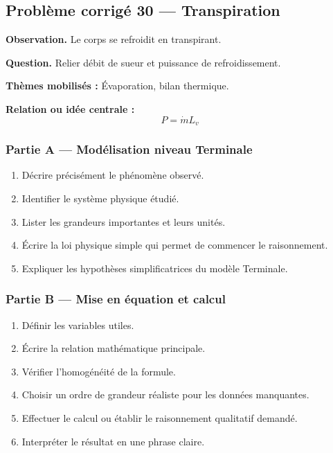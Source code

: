 \documentclass[11pt,a4paper]{article}
\begin{document}
\subsection{Problème corrigé 30 — Transpiration}

\begin{exercicebox}
\textbf{Observation.} Le corps se refroidit en transpirant.

\medskip
\textbf{Question.} Relier débit de sueur et puissance de refroidissement.

\medskip
\textbf{Thèmes mobilisés :} Évaporation, bilan thermique.

\medskip
\textbf{Relation ou idée centrale :}
\[
P=\dot mL_v
\]
\end{exercicebox}

\subsubsection*{Partie A — Modélisation niveau Terminale}

\begin{enumerate}
  \item Décrire précisément le phénomène observé.
  \item Identifier le système physique étudié.
  \item Lister les grandeurs importantes et leurs unités.
  \item Écrire la loi physique simple qui permet de commencer le raisonnement.
  \item Expliquer les hypothèses simplificatrices du modèle Terminale.
\end{enumerate}

\subsubsection*{Partie B — Mise en équation et calcul}

\begin{enumerate}
  \item Définir les variables utiles.
  \item Écrire la relation mathématique principale.
  \item Vérifier l'homogénéité de la formule.
  \item Choisir un ordre de grandeur réaliste pour les données manquantes.
  \item Effectuer le calcul ou établir le raisonnement qualitatif demandé.
  \item Interpréter le résultat en une phrase claire.
\end{enumerate}
\end{document}
